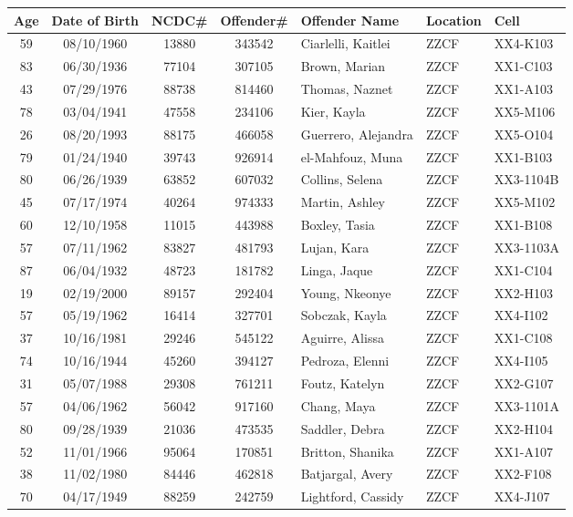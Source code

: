 \documentclass[]{article}
\begin{document}
\begin{tabular}{cccclll}
 {\textbf{Age}} & {\textbf{Date of Birth}} & {\textbf{NCDC\#}} & {\textbf{Offender\#}} & {\textbf{Offender Name}} & {\textbf{Location}} & {\textbf{Cell}} \\ 
  \hline
 59 & 08/10/1960 & 13880 & 343542 & Ciarlelli, Kaitlei & ZZCF & XX4-K103 \\ 
   83 & 06/30/1936 & 77104 & 307105 & Brown, Marian & ZZCF & XX1-C103 \\ 
   43 & 07/29/1976 & 88738 & 814460 & Thomas, Naznet & ZZCF & XX1-A103 \\ 
   78 & 03/04/1941 & 47558 & 234106 & Kier, Kayla & ZZCF & XX5-M106 \\ 
   26 & 08/20/1993 & 88175 & 466058 & Guerrero, Alejandra & ZZCF & XX5-O104 \\ 
   79 & 01/24/1940 & 39743 & 926914 & el-Mahfouz, Muna & ZZCF & XX1-B103 \\ 
   80 & 06/26/1939 & 63852 & 607032 & Collins, Selena & ZZCF & XX3-1104B \\ 
   45 & 07/17/1974 & 40264 & 974333 & Martin, Ashley & ZZCF & XX5-M102 \\ 
   60 & 12/10/1958 & 11015 & 443988 & Boxley, Tasia & ZZCF & XX1-B108 \\ 
   57 & 07/11/1962 & 83827 & 481793 & Lujan, Kara & ZZCF & XX3-1103A \\ 
   87 & 06/04/1932 & 48723 & 181782 & Linga, Jaque & ZZCF & XX1-C104 \\ 
   19 & 02/19/2000 & 89157 & 292404 & Young, Nkeonye & ZZCF & XX2-H103 \\ 
   57 & 05/19/1962 & 16414 & 327701 & Sobczak, Kayla & ZZCF & XX4-I102 \\ 
   37 & 10/16/1981 & 29246 & 545122 & Aguirre, Alissa & ZZCF & XX1-C108 \\ 
   74 & 10/16/1944 & 45260 & 394127 & Pedroza, Elenni & ZZCF & XX4-I105 \\ 
   31 & 05/07/1988 & 29308 & 761211 & Foutz, Katelyn & ZZCF & XX2-G107 \\ 
   57 & 04/06/1962 & 56042 & 917160 & Chang, Maya & ZZCF & XX3-1101A \\ 
   80 & 09/28/1939 & 21036 & 473535 & Saddler, Debra & ZZCF & XX2-H104 \\ 
   52 & 11/01/1966 & 95064 & 170851 & Britton, Shanika & ZZCF & XX1-A107 \\ 
   38 & 11/02/1980 & 84446 & 462818 & Batjargal, Avery & ZZCF & XX2-F108 \\ 
   70 & 04/17/1949 & 88259 & 242759 & Lightford, Cassidy & ZZCF & XX4-J107 \\ 

\end{tabular}
\end{document}
